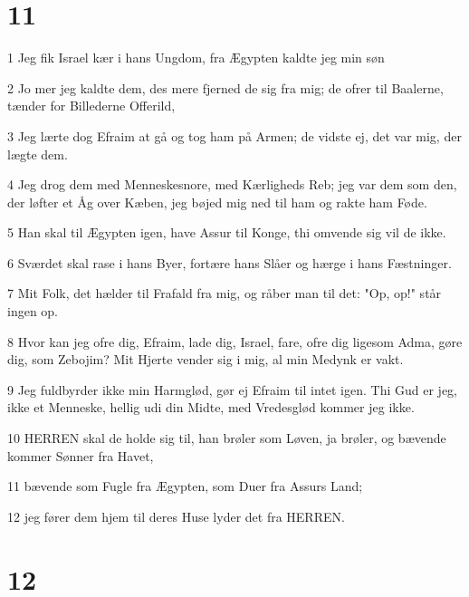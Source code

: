 \chapter{11}

\par 1 Jeg fik Israel kær i hans Ungdom, fra Ægypten kaldte jeg min søn
\par 2 Jo mer jeg kaldte dem, des mere fjerned de sig fra mig; de ofrer til Baalerne, tænder for Billederne Offerild,
\par 3 Jeg lærte dog Efraim at gå og tog ham på Armen; de vidste ej, det var mig, der lægte dem.
\par 4 Jeg drog dem med Menneskesnore, med Kærligheds Reb; jeg var dem som den, der løfter et Åg over Kæben, jeg bøjed mig ned til ham og rakte ham Føde.
\par 5 Han skal til Ægypten igen, have Assur til Konge, thi omvende sig vil de ikke.
\par 6 Sværdet skal rase i hans Byer, fortære hans Slåer og hærge i hans Fæstninger.
\par 7 Mit Folk, det hælder til Frafald fra mig, og råber man til det: "Op, op!" står ingen op.
\par 8 Hvor kan jeg ofre dig, Efraim, lade dig, Israel, fare, ofre dig ligesom Adma, gøre dig, som Zebojim? Mit Hjerte vender sig i mig, al min Medynk er vakt.
\par 9 Jeg fuldbyrder ikke min Harmglød, gør ej Efraim til intet igen. Thi Gud er jeg, ikke et Menneske, hellig udi din Midte, med Vredesglød kommer jeg ikke.
\par 10 HERREN skal de holde sig til, han brøler som Løven, ja brøler, og bævende kommer Sønner fra Havet,
\par 11 bævende som Fugle fra Ægypten, som Duer fra Assurs Land;
\par 12 jeg fører dem hjem til deres Huse lyder det fra HERREN.

\chapter{12}

